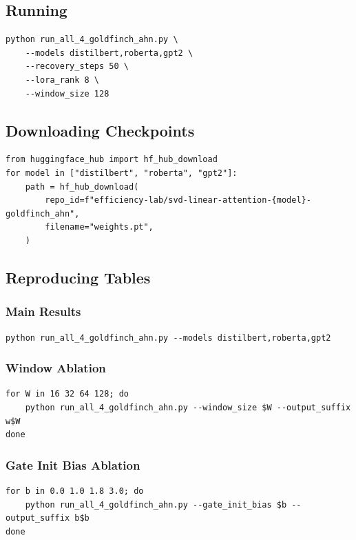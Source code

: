 \subsection{Running}

\begin{lstlisting}
python run_all_4_goldfinch_ahn.py \
    --models distilbert,roberta,gpt2 \
    --recovery_steps 50 \
    --lora_rank 8 \
    --window_size 128
\end{lstlisting}

\subsection{Downloading Checkpoints}

\begin{lstlisting}
from huggingface_hub import hf_hub_download
for model in ["distilbert", "roberta", "gpt2"]:
    path = hf_hub_download(
        repo_id=f"efficiency-lab/svd-linear-attention-{model}-goldfinch_ahn",
        filename="weights.pt",
    )
\end{lstlisting}

\subsection{Reproducing Tables}

\subsubsection{Main Results}

\begin{lstlisting}
python run_all_4_goldfinch_ahn.py --models distilbert,roberta,gpt2
\end{lstlisting}

\subsubsection{Window Ablation}

\begin{lstlisting}
for W in 16 32 64 128; do
    python run_all_4_goldfinch_ahn.py --window_size $W --output_suffix w$W
done
\end{lstlisting}

\subsubsection{Gate Init Bias Ablation}

\begin{lstlisting}
for b in 0.0 1.0 1.8 3.0; do
    python run_all_4_goldfinch_ahn.py --gate_init_bias $b --output_suffix b$b
done
\end{lstlisting}

